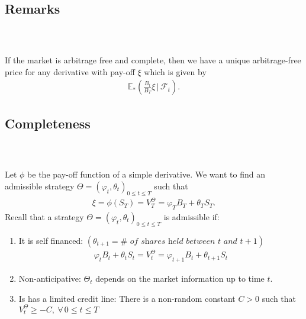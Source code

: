 \documentclass{beamer}
\numberwithin{equation}{section}
\begin{document}
\subsection{Remarks}
\begin{frame}\frametitle{{\normalsize \secname} \\ {\large \subsecname}}
    If the market is arbitrage free and complete, then we have a unique arbitrage-free price for any derivative with pay-off $\xi$ which is given by
    \begin{align}
        \mathbb{E}_*\left(\frac{B_t}{B_T}\xi\,\bigg|\,\mathscr{F}_t\right).
    \end{align}
\end{frame}

\subsection{Completeness}
\begin{frame}\frametitle{{\normalsize \secname} \\ {\large \subsecname}}
    Let $\phi$ be the pay-off function of a simple derivative. We want to find an admissible strategy $\Theta = (\varphi_t, \theta_t)_{0 \leq t \leq T}$ such that 
    \begin{align*}
        \xi = \phi(S_T) = V_T^{\Theta} = \varphi_TB_T + \theta_TS_T. 
    \end{align*}
    Recall that a strategy $\Theta = (\varphi_t, \theta_t)_{0 \leq t \leq T}$ is admissible if: 
    \begin{enumerate}
        \item It is self financed: $(\theta_{t+1} = \# \textit{ of shares held between } t \textit{ and } t+1)$
        \begin{align*}
            \varphi_tB_t + \theta_t S_t = V_t^{\Theta} = \varphi_{t+1}B_t + \theta_{t+1}S_t
        \end{align*}
        \item Non-anticipative: $\Theta_t$ depends on the market information up to time $t$. 
        \item Is has a limited credit line: There is a non-random constant $C > 0$ such that $V_t^{\Theta} \geq - C, \ \forall \, 0 \leq t \leq T$
    \end{enumerate}
\end{frame}
\end{document}
